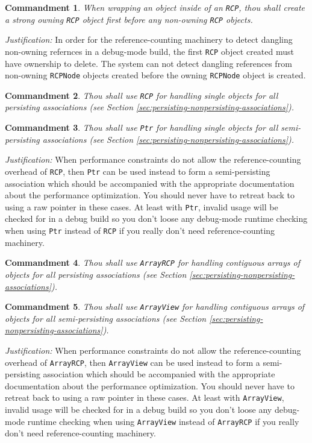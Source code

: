 \documentclass[pdf,ps2pdf,11pt]{SANDreport}
\newtheorem{commandment}{Commandment}
\begin{document}
\begin{commandment}\label{cmnd:owning-rcp-first}
When wrapping an object inside of an {}\texttt{RCP}, thou shall create
a strong owning {}\texttt{RCP} object first before any non-owning
{}\texttt{RCP} objects.
\end{commandment}
{}\textit{Justification:} In order for the reference-counting
machinery to detect dangling non-owning refernces in a debug-mode
build, the first {}\texttt{RCP} object created must have ownership to
delete.  The system can not detect dangling references from non-owning
{}\texttt{RCPNode} objects created before the owning
{}\texttt{RCPNode} object is created.

\begin{commandment}
Thou shall use {}\texttt{RCP} for handling single objects for all
persisting associations (see Section
{}\ref{sec:persisting-nonpersisting-associations}).
\end{commandment}

\begin{commandment}\label{cmnd:ptr-semi-persisting}
Thou shall use {}\texttt{Ptr} for handling single objects for all
semi-persisting associations (see Section
{}\ref{sec:persisting-nonpersisting-associations}).
\end{commandment}
{}\textit{Justification:} When performance constraints do not allow
the reference-counting overhead of {}\texttt{RCP}, then {}\texttt{Ptr}
can be used instead to form a semi-persisting association which should
be accompanied with the appropriate documentation about the
performance optimization.  You should never have to retreat back to
using a raw pointer in these cases.  At least with {}\texttt{Ptr},
invalid usage will be checked for in a debug build so you don't loose
any debug-mode runtime checking when using {}\texttt{Ptr} instead of
{}\texttt{RCP} if you really don't need reference-counting machinery.

\begin{commandment}
Thou shall use {}\texttt{ArrayRCP} for handling contiguous arrays of
objects for all persisting associations (see Section
{}\ref{sec:persisting-nonpersisting-associations}).
\end{commandment}

\begin{commandment}\label{cmnd:arrayview-semi-persisting}
Thou shall use {}\texttt{ArrayView} for handling contiguous arrays of
objects for all semi-persisting associations (see Section
{}\ref{sec:persisting-nonpersisting-associations}).
\end{commandment}
{}\textit{Justification:} When performance constraints do not allow
the reference-counting overhead of {}\texttt{ArrayRCP}, then
{}\texttt{ArrayView} can be used instead to form a semi-persisting
association which should be accompanied with the appropriate
documentation about the performance optimization.  You should never
have to retreat back to using a raw pointer in these cases.  At least
with {}\texttt{ArrayView}, invalid usage will be checked for in a
debug build so you don't loose any debug-mode runtime checking when
using {}\texttt{ArrayView} instead of {}\texttt{ArrayRCP} if you
really don't need reference-counting machinery.
\end{document}
